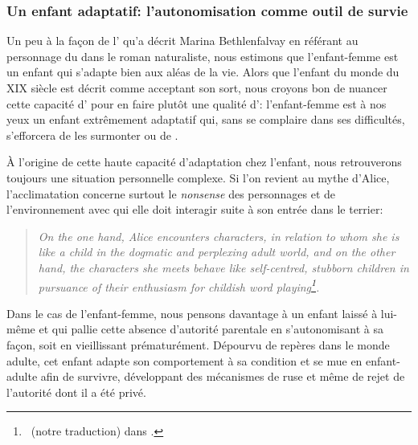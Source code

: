 \subsubsection{Un enfant adaptatif: l'autonomisation comme outil de survie}
Un peu à la façon de l' qu'a décrit Marina Bethlenfalvay en référant au personnage du  dans le roman naturaliste, nous estimons que l'enfant-femme est un enfant qui s'adapte bien aux aléas de la vie.
Alors que l'enfant du monde du XIX siècle est décrit comme acceptant son sort, nous croyons bon de nuancer cette capacité d' pour en faire plutôt une qualité d': l'enfant-femme est à nos yeux un enfant extrêmement adaptatif qui, sans se complaire dans ses difficultés, s'efforcera de les surmonter ou de .
\par
À l'origine de cette haute capacité d'adaptation chez l'enfant, nous retrouverons toujours une situation personnelle complexe.
Si l'on revient au mythe d'Alice, l'acclimatation concerne surtout le \textit{nonsense} des personnages et de l'environnement avec qui elle doit interagir suite à son entrée dans le terrier:
\begin{quote}
  \begin{singlespace}
    \small
    \textit{On the one hand, Alice encounters characters, in relation to whom she is like a child in the dogmatic and perplexing adult world, and on the other hand, the characters she meets behave like self-centred, stubborn children in pursuance of their enthusiasm for childish word playing\footnote{~(notre traduction) dans \mancite \cite[39]{Katajamaki2005}.}.}
    \normalsize
  \end{singlespace}
\end{quote}
Dans le cas de l'enfant-femme, nous pensons davantage à un enfant laissé à lui-même et qui pallie cette absence d'autorité parentale en s'autonomisant à sa façon, soit en vieillissant prématurément.
Dépourvu de repères dans le monde adulte, cet enfant adapte son comportement à sa condition et se mue en enfant-adulte afin de survivre, développant des mécanismes de ruse et même de rejet de l'autorité dont il a été privé.

